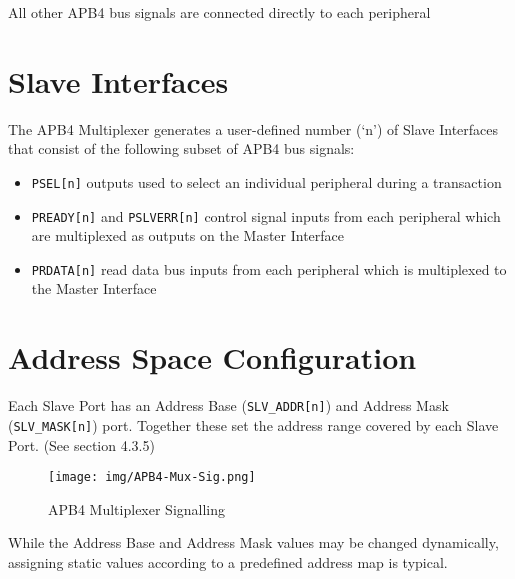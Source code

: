 All other APB4 bus signals are connected directly to each peripheral

\section{Slave Interfaces} \label{slave-interfaces}

The APB4 Multiplexer generates a user-defined number (`n') of Slave
Interfaces that consist of the following subset of APB4 bus signals:

\begin{itemize}
\item
  \texttt{PSEL[n]} outputs used to select an individual peripheral during a
  transaction
\item
  \texttt{PREADY[n]} and \texttt{PSLVERR[n]} control signal inputs from each
  peripheral which are multiplexed as outputs on the Master Interface
\item
  \texttt{PRDATA[n]} read data bus inputs from each peripheral which is
  multiplexed to the Master Interface
\end{itemize}

\section{Address Space Configuration} \label{address-space-configuration}

Each Slave Port has an Address Base (\texttt{SLV\_ADDR[n]}) and Address Mask
(\texttt{SLV\_MASK[n]}) port. Together these set the address range covered by
each Slave Port. (See section 4.3.5)

\begin{figure*}[htb]
	\centering
	\texttt{[image: img/APB4-Mux-Sig.png]}
	\caption{APB4 Multiplexer Signalling}
	\label{fig:apb4-mux-sig}
\end{figure*}

While the Address Base and Address Mask values may be changed dynamically,
assigning static values according to a predefined address map is
typical.
